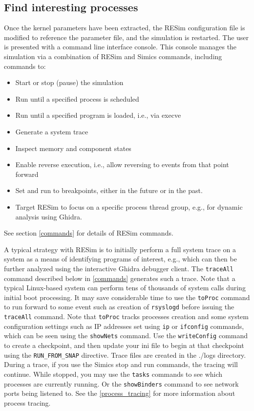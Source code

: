 \documentclass[titlepage]{article}
\begin{document}
\subsection{Find interesting processes}
Once the kernel parameters have been extracted, the RESim configuration file is modified to reference the parameter file, and the simulation is restarted. The user is
presented with a command line interface console.  This console manages the simulation via a combination of RESim and Simics commands, including commands to:
\begin{itemize}
\item Start or stop (pause) the simulation
\item Run until a specified process is scheduled
\item Run until a specified program is loaded, i.e., via execve
\item Generate a system trace
\item Inspect memory and component states
\item Enable reverse execution, i.e., allow reversing to events from that point forward
\item Set and run to breakpoints, either in the future or in the past.
\item Target RESim to focus on a specific process thread group, e.g., for dynamic analysis using Ghidra.
\end{itemize}
\noindent See section \ref{commands} for details of RESim commands.

A typical strategy with RESim is to initially perform a full system trace on a system as a means of identifying programs of interest, e.g., which can then be
further analyzed using the interactive Ghidra debugger client.  The {\tt traceAll} command described below in \ref{commands} generates such a trace.  Note that a typical Linux-based
system can perform tens of thousands of system calls during initial boot processing.  It may save considerable time to use the {\tt toProc} command to run forward to some
event such as creation of {\tt rsyslogd} before issuing the {\tt traceAll} command.  Note that {\tt toProc} tracks processes creation and some system configuration settings such as
IP addresses set using {\tt ip} or {\tt ifconfig} commands, which can be seen using the {\tt showNets} command.  Use the {\tt writeConfig} command to create a checkpoint,
and then update your ini file to begin at that checkpoint using the {\tt RUN\_FROM\_SNAP} directive.  Trace files are created in the ./logs directory.  During a trace, if you use the Simics stop and
run commands, the tracing will continue.  While stopped, you may use the {\tt tasks} commands to see which processes are currently running.  Or the {\tt showBinders} command to 
see network ports being listened to. See the \ref{process_tracing} for more information about process tracing. 
\end{document}
